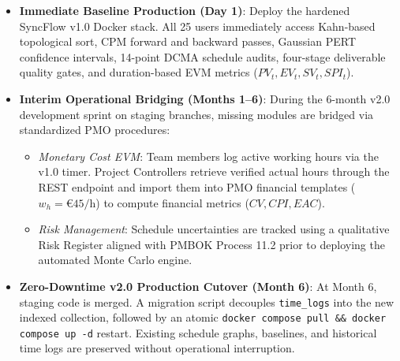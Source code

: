 \begin{itemize}[itemsep=1pt,topsep=1.5pt]
	\item \textbf{Immediate Baseline Production (Day 1)}: Deploy the hardened SyncFlow v1.0 Docker stack. All 25 users immediately access Kahn-based topological sort, CPM forward and backward passes, Gaussian PERT confidence intervals, 14-point DCMA schedule audits, four-stage deliverable quality gates, and duration-based EVM metrics ($PV_t, EV_t, SV_t, SPI_t$).
	\item \textbf{Interim Operational Bridging (Months 1--6)}: During the 6-month v2.0 development sprint on staging branches, missing modules are bridged via standardized PMO procedures:
	\begin{itemize}[itemsep=0.5pt,topsep=0.5pt]
		\item \textit{Monetary Cost EVM}: Team members log active working hours via the v1.0 timer. Project Controllers retrieve verified actual hours through the  REST endpoint and import them into PMO financial templates ($w_h = \text{€45/h}$) to compute financial metrics ($CV, CPI, EAC$).
		\item \textit{Risk Management}: Schedule uncertainties are tracked using a qualitative Risk Register aligned with PMBOK Process 11.2 prior to deploying the automated Monte Carlo engine.
	\end{itemize}
	\item \textbf{Zero-Downtime v2.0 Production Cutover (Month 6)}: At Month 6, staging code is merged. A migration script decouples \texttt{time\_logs} into the new indexed collection, followed by an atomic \texttt{docker compose pull \&\& docker compose up -d} restart. Existing schedule graphs, baselines, and historical time logs are preserved without operational interruption.
\end{itemize}
